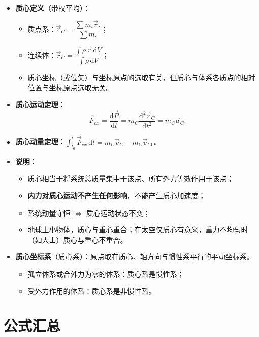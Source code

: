 \documentclass[12pt,a4paper]{ctexart}
\begin{document}
\begin{itemize}
    \item \textbf{质心定义}（带权平均）：
    \begin{itemize}
        \item 质点系：$\vec{r}_C = \dfrac{\sum m_i \vec{r}_i}{\sum m_i}$；
        \item 连续体：$\vec{r}_C = \dfrac{\int \rho\,\vec{r}\,\mathrm{d}V}{\int \rho\,\mathrm{d}V}$；
        \item 质心坐标（或位矢）与坐标原点的选取有关，但质心与体系各质点的相对位置与坐标原点选取无关。
    \end{itemize}
    \item \textbf{质心运动定理}：
    \[
        \vec{F}_{ex} = \frac{\mathrm{d}\vec{P}}{\mathrm{d}t} = m_C\frac{\mathrm{d}^2\vec{r}_C}{\mathrm{d}t^2} = m_C\vec{a}_C.
    \]
    \item \textbf{质心动量定理}：$\displaystyle\int_{t_0}^t \vec{F}_{ex}\,\mathrm{d}t = m_C\vec{v}_C - m_C\vec{v}_{C0}$。
    \item \textbf{说明}：
    \begin{itemize}
        \item 质心相当于将系统总质量集中于该点、所有外力等效作用于该点；
        \item \textbf{内力对质心运动不产生任何影响}，不能产生质心加速度；
        \item 系统动量守恒 $\Leftrightarrow$ 质心运动状态不变；
        \item 地球上小物体，质心与重心重合；在太空仅质心有意义，重力不均匀时（如大山）质心与重心不重合。
    \end{itemize}
    \item \textbf{质心坐标系}（质心系）：原点取在质心、轴方向与惯性系平行的平动坐标系。
    \begin{itemize}
        \item 孤立体系或合外力为零的体系：质心系是惯性系；
        \item 受外力作用的体系：质心系是非惯性系。
    \end{itemize}
\end{itemize}

\section{公式汇总}
\end{document}
